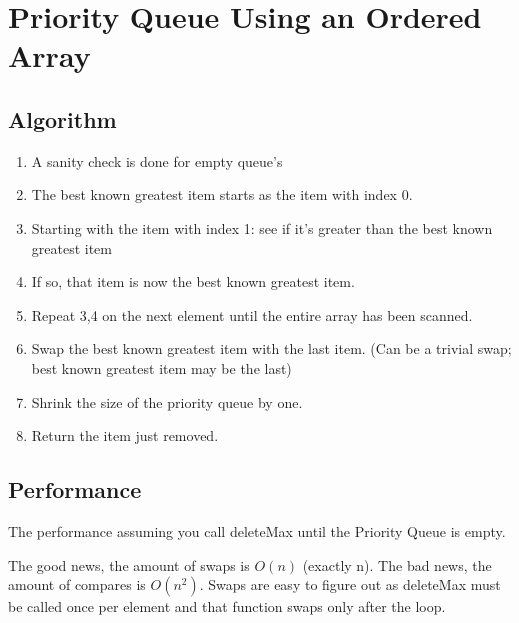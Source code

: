 \documentclass[12pt]{amsart}
\begin{document}
\section{Priority Queue Using an Ordered Array}
    \subsection{Algorithm}
    \begin{enumerate}
        \item
            A sanity check is done for empty queue's
         \item
             The best known greatest item starts as the item with index 0.
         \item
             Starting with the item with index 1: see if it's greater than the best known greatest item
         \item
             If so, that item is now the best known greatest item.
         \item
             Repeat 3,4 on the next element until the entire array has been scanned.
         \item
             Swap the best known greatest item with the last item. (Can be a trivial swap; best known greatest item may be the last)
         \item
             Shrink the size of the priority queue by one.
         \item
             Return the item just removed.
    \end{enumerate}

    \subsection{Performance}
    
    The performance assuming you call deleteMax until the Priority Queue is empty.
    
    The good news, the amount of swaps is $O(n)$ (exactly n). The bad news, the amount of compares is $O(n^2)
$. 
    Swaps are easy to figure out as deleteMax must be called once per element and that function swaps only after the loop. \\
\end{document}
